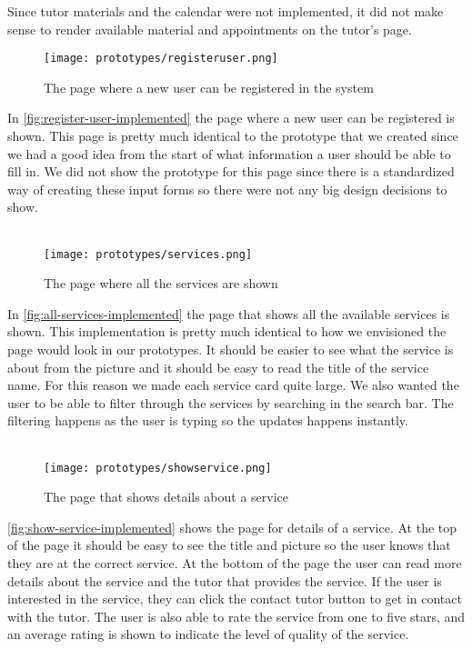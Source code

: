 Since tutor materials and the calendar were not implemented, it did not make sense to render available material and appointments on the tutor's page.
\begin{figure}
    \centering
    \texttt{[image: prototypes/registeruser.png]} 
    \caption{The page where a new user can be registered in the system}
    \label{fig:register-user-implemented}
\end{figure}
In \autoref{fig:register-user-implemented} the page where a new user can be registered is shown.
This page is pretty much identical to the prototype that we created since we had a good idea from the start of what information a user should be able to fill in. 
We did not show the prototype for this page since there is a standardized way of creating these input forms so there were not any big design decisions to show.
\\\\
\begin{figure}
    \centering
    \texttt{[image: prototypes/services.png]}
    \caption{The page where all the services are shown}
    \label{fig:all-services-implemented}
\end{figure}
In \autoref{fig:all-services-implemented} the page that shows all the available services is shown. 
This implementation is pretty much identical to how we envisioned the page would look in our prototypes. 
It should be easier to see what the service is about from the picture and it should be easy to read the title of the service name.
For this reason we made each service card quite large.
We also wanted the user to be able to filter through the services by searching in the search bar. 
The filtering happens as the user is typing so the updates happens instantly.
\\\\
\begin{figure}
    \centering
    \texttt{[image: prototypes/showservice.png]} 
    \caption{The page that shows details about a service}
    \label{fig:show-service-implemented}
\end{figure}
\autoref{fig:show-service-implemented} shows the page for details of a service.
At the top of the page it should be easy to see the title and picture so the user knows that they are at the correct service.
At the bottom of the page the user can read more details about the service and the tutor that provides the service.
If the user is interested in the service, they can click the contact tutor button to get in contact with the tutor.
The user is also able to rate the service from one to five stars, and an average rating is shown to indicate the level of quality of the service.
